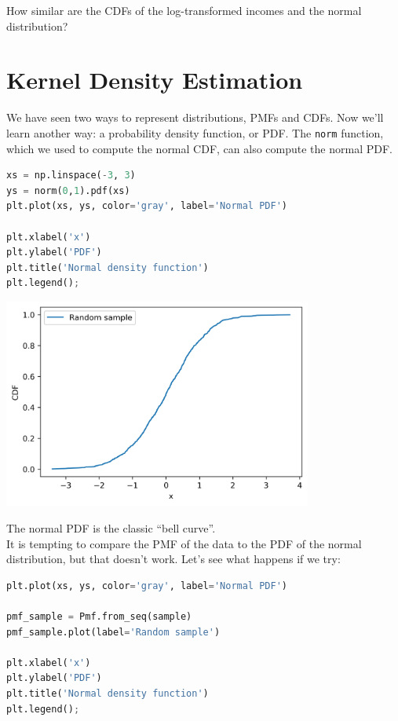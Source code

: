 How similar are the CDFs of the log-transformed incomes and the normal
distribution?

\hypertarget{kernel-density-estimation}{%
\section{Kernel Density Estimation}\label{kernel-density-estimation}}

We have seen two ways to represent distributions, PMFs and CDFs. Now
we'll learn another way: a probability density function, or PDF. The
\passthrough{\lstinline!norm!} function, which we used to compute the
normal CDF, can also compute the normal PDF.

\begin{lstlisting}[language=Python,style=source]
xs = np.linspace(-3, 3)
ys = norm(0,1).pdf(xs)
plt.plot(xs, ys, color='gray', label='Normal PDF')

plt.xlabel('x')
plt.ylabel('PDF')
plt.title('Normal density function')
plt.legend();
\end{lstlisting}

\begin{center}
\includegraphics[width=4in]{chapters/08_distributions_files/08_distributions_111_0.png}
\end{center}

The normal PDF is the classic ``bell curve''.\\
It is tempting to compare the PMF of the data to the PDF of the normal
distribution, but that doesn't work. Let's see what happens if we try:

\begin{lstlisting}[language=Python,style=source]
plt.plot(xs, ys, color='gray', label='Normal PDF')

pmf_sample = Pmf.from_seq(sample)
pmf_sample.plot(label='Random sample')

plt.xlabel('x')
plt.ylabel('PDF')
plt.title('Normal density function')
plt.legend();
\end{lstlisting}

